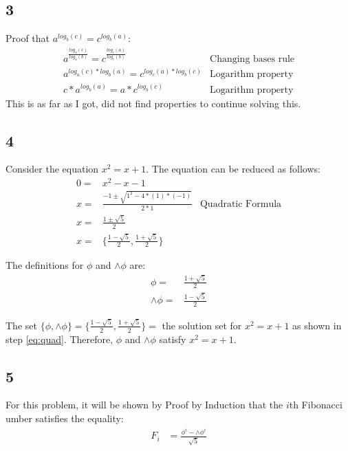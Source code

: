 \documentclass[11pt,letterpaper]{article}
\begin{document}
\subsection*{3}
Proof that $a^{log_b(c)} = c^{log_b(a)}$:
\begin{eqnarray}
	a^{ \frac{ log_a(c) }{ log_a(b) } } = c^{ \frac{ log_c(a) }{ log_c(b) } }		& \mbox{Changing bases rule}\\
	a^{ log_a(c) * log_b(a) } = c^{ log_c(a) * log_b(c) } 					& \mbox{Logarithm property} \\
	c * a^{ log_b(a) } = a * c^{ log_b(c) }							& \mbox{Logarithm property} %
\end{eqnarray}
This is as far as I got, did not find properties to continue solving this.

\subsection*{4}
Consider the equation $x^2 = x + 1$. The equation can be reduced as follows:
\begin{eqnarray}
	0 = 		& 	x^2 - x - 1 								&	\\
	x = 		&	\frac{ -1 \pm \sqrt{ 1^2 - 4 * (1) * (-1) } }{2 * 1}	& 	\mbox{Quadratic Formula} \\
	x = 		&	\frac{ 1 \pm \sqrt{5} }{2}						&	\\
	x =		&	\{ \frac{ 1 - \sqrt{5} }{ 2 }, \frac{ 1 + \sqrt{5} }{ 2 } \}	\label{eq:quad}
\end{eqnarray}

The definitions for $\phi$ and $\wedge\phi$ are:
\begin{eqnarray}
	\phi = 		&	\frac{ 1 + \sqrt{5} }{ 2 } 	\label{eq:phi}\\
	\wedge\phi =	&	\frac{ 1 - \sqrt{5} }{ 2 }	\label{eq:conj_phi}
\end{eqnarray}

The set $ \{ \phi, \wedge\phi \} = \{ \frac{ 1 - \sqrt{5} }{ 2 }, \frac{ 1 + \sqrt{5} }{ 2 } \} = $ the solution set
for $x^2 = x + 1$ as shown in step \ref{eq:quad}. Therefore, $\phi$ and $\wedge\phi$ satisfy $x^2 = x + 1$.


\subsection*{5}
For this problem, it will be shown by Proof by Induction that the $i$th Fibonacci umber satisfies the equality:
\begin{eqnarray}
	F_i 		& = \frac{ \phi^i - \wedge\phi^i }{ \sqrt{5} } 
\end{eqnarray}
\end{document}
